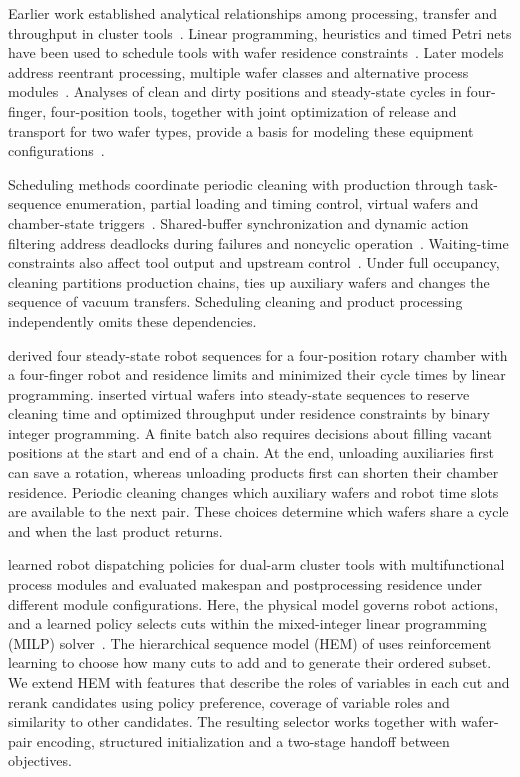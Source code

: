 \documentclass[preprint,12pt,nonatbib]{elsarticle}
\begin{document}
Earlier work established analytical relationships among processing, transfer and throughput in cluster tools~\citep{perkinson1994throughput}. Linear programming, heuristics and timed Petri nets have been used to schedule tools with wafer residence constraints~\citep{rostami2002optimal,wu2010closedform,qiao2012sojourn}. Later models address reentrant processing, multiple wafer classes and alternative process modules~\citep{qiao2014revisiting,wang2020multiple,wang2025virtualcell}. Analyses of clean and dirty positions and steady-state cycles in four-finger, four-position tools, together with joint optimization of release and transport for two wafer types, provide a basis for modeling these equipment configurations~\citep{gu2024multifinger,yang2025miptwowafers}.

Scheduling methods coordinate periodic cleaning with production through task-sequence enumeration, partial loading and timing control, virtual wafers and chamber-state triggers~\citep{kim2013cleaning,yu2020delay,qiao2022binary,li2022conditioncleaning}. Shared-buffer synchronization and dynamic action filtering address deadlocks during failures and noncyclic operation~\citep{zhu2025failuredeadlock,kim2025noncyclicdeadlock}. Waiting-time constraints also affect tool output and upstream control~\citep{lee2018waiting}. Under full occupancy, cleaning partitions production chains, ties up auxiliary wafers and changes the sequence of vacuum transfers. Scheduling cleaning and product processing independently omits these dependencies.

\textcite{gu2024applied} derived four steady-state robot sequences for a four-position rotary chamber with a four-finger robot and residence limits and minimized their cycle times by linear programming. \textcite{qiao2022binary} inserted virtual wafers into steady-state sequences to reserve cleaning time and optimized throughput under residence constraints by binary integer programming. A finite batch also requires decisions about filling vacant positions at the start and end of a chain. At the end, unloading auxiliaries first can save a rotation, whereas unloading products first can shorten their chamber residence. Periodic cleaning changes which auxiliary wafers and robot time slots are available to the next pair. These choices determine which wafers share a cycle and when the last product returns.

\textcite{zhu2026multifunction} learned robot dispatching policies for dual-arm cluster tools with multifunctional process modules and evaluated makespan and postprocessing residence under different module configurations. Here, the physical model governs robot actions, and a learned policy selects cuts within the mixed-integer linear programming (MILP) solver~\citep{tang2020cut,huang2022cutranking,paulus2022looking}. The hierarchical sequence model (HEM) of \textcite{wang2023hem,wang2024hem} uses reinforcement learning to choose how many cuts to add and to generate their ordered subset. We extend HEM with features that describe the roles of variables in each cut and rerank candidates using policy preference, coverage of variable roles and similarity to other candidates. The resulting selector works together with wafer-pair encoding, structured initialization and a two-stage handoff between objectives.
\end{document}
